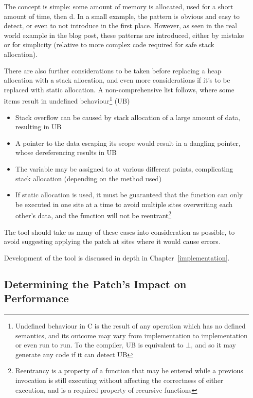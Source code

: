 The concept is simple: some amount of memory is allocated, used for a short amount of time, then \free{}d. In a small example, the pattern is obvious and easy to detect, or even to not introduce in the first place. However, as seen in the real world  example in the blog post, these patterns are introduced, either by mistake or for simplicity (relative to more complex code required for safe stack allocation).

There are also further considerations to be taken before replacing a heap allocation with a stack allocation, and even more considerations if it's to be replaced with static allocation. A non-comprehensive list follows, where some items result in undefined behaviour\footnote{Undefined behaviour in C is the result of any operation which has no defined semantics, and its outcome may vary from implementation to implementation or even run to run. To the compiler, UB is equivalent to $\bot$, and so it may generate any code if it can detect UB} (UB)

\begin{itemize}
	\itemsep-0.25em
	\item Stack overflow can be caused by stack allocation of a large amount of data, resulting in UB
	\item A pointer to the data escaping its scope would result in a dangling pointer, whose dereferencing results in UB
	\item The variable may be assigned to at various different points, complicating stack allocation (depending on the method used)
	\item If static allocation is used, it must be guaranteed that the function can only be executed in one site at a time to avoid multiple sites overwriting each other's data, and the function will not be reentrant\footnote{Reentrancy is a property of a function that may be entered while a previous invocation is still executing without affecting the correctness of either execution, and is a required property of recursive functions}
\end{itemize}

The tool should take as many of these cases into consideration as possible, to avoid suggesting applying the patch at sites where it would cause errors.

Development of the tool is discussed in depth in Chapter~\ref{implementation}.

\subsection{Determining the Patch's Impact on Performance}

